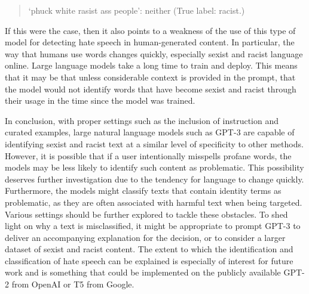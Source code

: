 \documentclass{bmcart}
\begin{document}
\begin{quote}
`phuck white rasist ass people': neither (True label: racist.)
\end{quote}

If this were the case, then it also points to a weakness of the use of this type of model for detecting hate speech in human-generated content. In particular, the way that humans use words changes quickly, especially sexist and racist language online. Large language models take a long time to train and deploy. This means that it may be that unless considerable context is provided in the prompt, that the model would not identify words that have become sexist and racist through their usage in the time since the model was trained.

In conclusion, with proper settings such as the inclusion of instruction and curated examples, large natural language models such as GPT-3 are capable of identifying sexist and racist text at a similar level of specificity to other methods. However, it is possible that if a user intentionally misspells profane words, the models may be less likely to identify such content as problematic. This possibility deserves further investigation due to the tendency for language to change quickly. Furthermore, the models might classify texts that contain identity terms as problematic, as they are often associated with harmful text when being targeted. Various settings should be further explored to tackle these obstacles. To shed light on why a text is misclassified, it might be appropriate to prompt GPT-3 to deliver an accompanying explanation for the decision, or to consider a larger dataset of sexist and racist content. The extent to which the identification and classification of hate speech can be explained is especially of interest for future work and is something that could be implemented on the publicly available GPT-2 from OpenAI or T5 from Google.





\end{document}
